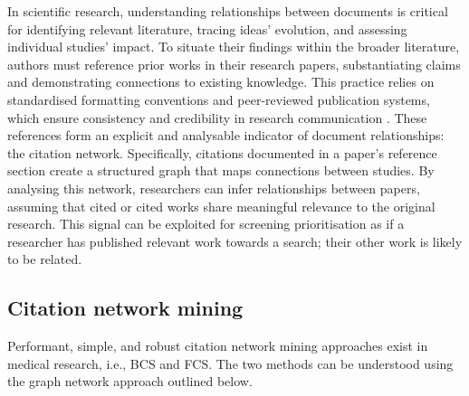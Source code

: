 \documentclass[10pt,oneside]{book}
\begin{document}
In scientific research, understanding relationships between documents is critical for identifying relevant literature, tracing ideas' evolution, and assessing individual studies' impact. To situate their findings within the broader literature, authors must reference prior works in their research papers, substantiating claims and demonstrating connections to existing knowledge. This practice relies on standardised formatting conventions and peer-reviewed publication systems, which ensure consistency and credibility in research communication \cite{noauthor_bmc_nodate}. These references form an explicit and analysable indicator of document relationships: the citation network. Specifically, citations documented in a paper's reference section create a structured graph that maps connections between studies. By analysing this network, researchers can infer relationships between papers, assuming that cited or cited works share meaningful relevance to the original research. This signal can be exploited for screening prioritisation as if a researcher has published relevant work towards a search; their other work is likely to be related.

\subsection{Citation network mining}

Performant, simple, and robust citation network mining approaches exist in medical research, i.e., BCS and FCS. The two methods can be understood using the graph network approach outlined below.
\end{document}
